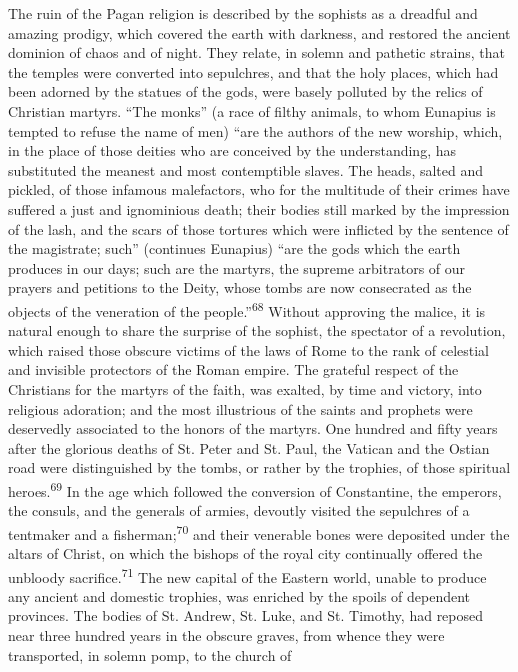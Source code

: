 The ruin of the Pagan religion is described by the sophists as a
dreadful and amazing prodigy, which covered the earth with
darkness, and restored the ancient dominion of chaos and of
night. They relate, in solemn and pathetic strains, that the
temples were converted into sepulchres, and that the holy places,
which had been adorned by the statues of the gods, were basely
polluted by the relics of Christian martyrs. “The monks” (a race
of filthy animals, to whom Eunapius is tempted to refuse the name
of men) “are the authors of the new worship, which, in the place
of those deities who are conceived by the understanding, has
substituted the meanest and most contemptible slaves. The heads,
salted and pickled, of those infamous malefactors, who for the
multitude of their crimes have suffered a just and ignominious
death; their bodies still marked by the impression of the lash,
and the scars of those tortures which were inflicted by the
sentence of the magistrate; such” (continues Eunapius) “are the
gods which the earth produces in our days; such are the martyrs,
the supreme arbitrators of our prayers and petitions to the
Deity, whose tombs are now consecrated as the objects of the
veneration of the people.”\textsuperscript{68} Without approving the malice, it is
natural enough to share the surprise of the sophist, the
spectator of a revolution, which raised those obscure victims of
the laws of Rome to the rank of celestial and invisible
protectors of the Roman empire. The grateful respect of the
Christians for the martyrs of the faith, was exalted, by time and
victory, into religious adoration; and the most illustrious of
the saints and prophets were deservedly associated to the honors
of the martyrs. One hundred and fifty years after the glorious
deaths of St. Peter and St. Paul, the Vatican and the Ostian road
were distinguished by the tombs, or rather by the trophies, of
those spiritual heroes.\textsuperscript{69} In the age which followed the
conversion of Constantine, the emperors, the consuls, and the
generals of armies, devoutly visited the sepulchres of a
tentmaker and a fisherman;\textsuperscript{70} and their venerable bones were
deposited under the altars of Christ, on which the bishops of the
royal city continually offered the unbloody sacrifice.\textsuperscript{71} The new
capital of the Eastern world, unable to produce any ancient and
domestic trophies, was enriched by the spoils of dependent
provinces. The bodies of St. Andrew, St. Luke, and St. Timothy,
had reposed near three hundred years in the obscure graves, from
whence they were transported, in solemn pomp, to the church of
